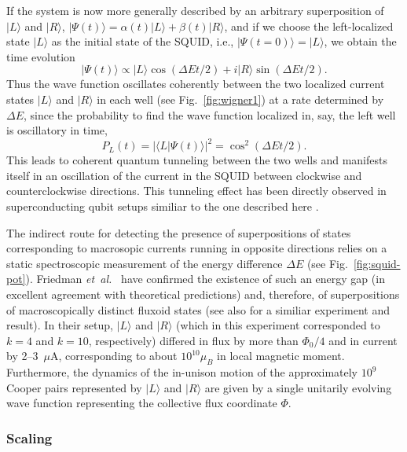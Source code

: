 \documentclass[twocolumn,aps,floatfix,amsmath,amssymb,showpacs,nofootinbib]{revtex4}
\newcommand{\be}{\begin{equation}} \newcommand{\ee}{\end{equation}}
\newcommand{\etal}{\emph{et~al.\ }}
\newcommand{\ket}[1]{\ensuremath{|{#1\rangle}}}
\newcommand{\braket}[2]{\ensuremath{{\langle #1}|{#2 \rangle}}}
\begin{document}
If the system is now more generally described by an arbitrary
superposition of $\ket{L}$ and $\ket{R}$, $\ket{\Psi(t)}= \alpha(t)
\ket{L} + \beta(t) \ket{R}$, and if we choose the left-localized state
$\ket{L}$ as the initial state of the SQUID, i.e., $\ket{\Psi(t=0)} =
\ket{L}$, we obtain the time evolution
%
\be
\ket{\Psi(t)} \propto \ket{L} \cos (\Delta E t / 2) + i \ket{R}
  \sin(\Delta E t / 2). 
\ee
%
Thus the wave function oscillates coherently between the two localized
current states $\ket{L}$ and $\ket{R}$ in each well (see
Fig.~\ref{fig:wigner1}) at a rate determined by $\Delta E$, since the
probability to find the wave function localized in, say, the left well
is oscillatory in time,
%
\be
P_L(t) = | \braket{L}{\Psi(t)} |^2 = \cos^2 (\Delta E t / 2).
\ee
%
This leads to coherent quantum tunneling between the two wells and
manifests itself in an oscillation of the current in the SQUID between
clockwise and counterclockwise directions. This tunneling effect has
been directly observed in superconducting qubit setups similiar to the
one described here
\cite{Nakamura:1999:ub,Korotkov:2001:mq,Korotkov:2001:my,Greenberg:2002:mi,%
  Martinis:2002:qq,Yu:2002:yb,Vion:2002:oo}.  

The indirect route for detecting the presence of superpositions of states
corresponding to macrosopic currents running in opposite directions
relies on a static spectroscopic measurement of the energy difference
$\Delta E$ (see Fig.~\ref{fig:squid-pot}). Friedman \etal
\cite{Friedman:2000:rr} have confirmed the existence of such an energy
gap (in excellent agreement with theoretical predictions) and,
therefore, of superpositions of macroscopically distinct fluxoid states
(see also \cite{Wal:2000:om} for a similiar experiment and
result). In their setup, $\ket{L}$ and $\ket{R}$ (which in this
experiment corresponded to $k=4$ and $k=10$, respectively) differed in
flux by more than $\Phi_0/4$ and in current by 2--3~$\mu$A,
corresponding to about $10^{10} \mu_B$ in local magnetic moment.
Furthermore, the dynamics of the in-unison motion of the approximately
$10^9$ Cooper pairs represented by $\ket{L}$ and $\ket{R}$ are given
by a single unitarily evolving wave function representing the
collective flux coordinate $\Phi$.


\subsubsection{Scaling}
\end{document}
